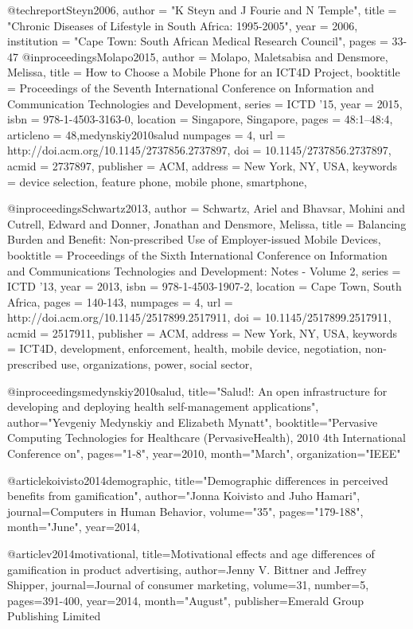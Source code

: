 @techreport{Steyn2006,
	author = "K Steyn and J Fourie and N Temple",
	title = "Chronic Diseases of Lifestyle in South Africa: 1995-2005",
	year = {2006},
	institution = "Cape Town: South African Medical Research Council",
	pages = {33-47}
}
@inproceedings{Molapo2015,
 author = {Molapo, Maletsabisa and Densmore, Melissa},
 title = {How to Choose a Mobile Phone for an ICT4D Project},
 booktitle = {Proceedings of the Seventh International Conference on Information and Communication Technologies and Development},
 series = {ICTD '15},
 year = {2015},
 isbn = {978-1-4503-3163-0},
 location = {Singapore, Singapore},
 pages = {48:1--48:4},
 articleno = {48},medynskiy2010salud
 numpages = {4},
 url = {http://doi.acm.org/10.1145/2737856.2737897},
 doi = {10.1145/2737856.2737897},
 acmid = {2737897},
 publisher = {ACM},
 address = {New York, NY, USA},
 keywords = {device selection, feature phone, mobile phone, smartphone},
} 


@inproceedings{Schwartz2013,
 author = {Schwartz, Ariel and Bhavsar, Mohini and Cutrell, Edward and Donner, Jonathan and Densmore, Melissa},
 title = {Balancing Burden and Benefit: Non-prescribed Use of Employer-issued Mobile Devices},
 booktitle = {Proceedings of the Sixth International Conference on Information and Communications Technologies and Development: Notes - Volume 2},
 series = {ICTD '13},
 year = {2013},
 isbn = {978-1-4503-1907-2},
 location = {Cape Town, South Africa},
 pages = {140-143},
 numpages = {4},
 url = {http://doi.acm.org/10.1145/2517899.2517911},
 doi = {10.1145/2517899.2517911},
 acmid = {2517911},
 publisher = {ACM},
 address = {New York, NY, USA},
 keywords = {ICT4D, development, enforcement, health, mobile device, negotiation, non-prescribed use, organizations, power, social sector},
} 

@inproceedings{medynskiy2010salud,
  title="Salud!: An open infrastructure for developing and deploying health self-management applications",
  author="Yevgeniy Medynskiy and Elizabeth Mynatt",
  booktitle="Pervasive Computing Technologies for Healthcare (PervasiveHealth), 2010 4th International Conference on",
  pages="1-8",
  year={2010},
  month="March",
  organization="IEEE"
}

@article{koivisto2014demographic,
  title="Demographic differences in perceived benefits from gamification",
  author="Jonna Koivisto and Juho Hamari",
  journal={Computers in Human Behavior},
  volume="35",
  pages="179-188",
  month="June",
  year={2014},
}

@article{v2014motivational,
  title={Motivational effects and age differences of gamification in product advertising},
  author={Jenny V. Bittner and Jeffrey Shipper},
  journal={Journal of consumer marketing},
  volume={31},
  number={5},
  pages={391-400},
  year={2014},
  month="August",
  publisher={Emerald Group Publishing Limited}
}
